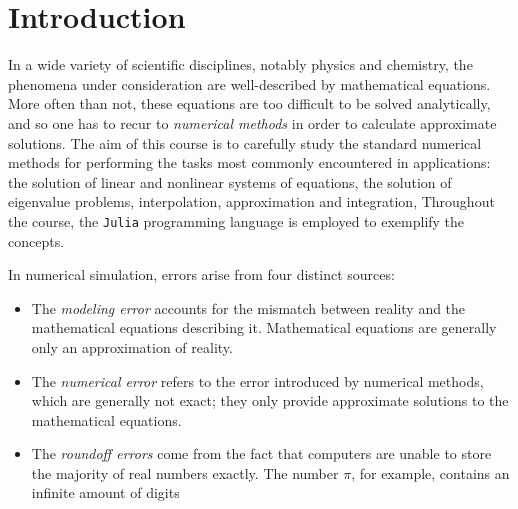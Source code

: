 \chapter*{Introduction}%
In a wide variety of scientific disciplines,
notably physics and chemistry,
the phenomena under consideration are well-described by mathematical equations.
More often than not,
these equations are too difficult to be solved analytically,
and so one has to recur to \emph{numerical methods} in order to calculate approximate solutions.
The aim of this course is to carefully study the standard numerical methods for performing the tasks most commonly encountered in applications:
the solution of linear and nonlinear systems of equations,
the solution of eigenvalue problems,
interpolation,
approximation and integration,
Throughout the course, the \texttt{Julia} programming language is employed to exemplify the concepts.

In numerical simulation,
errors arise from four distinct sources:
\begin{itemize}
    \item
        The \emph{modeling error} accounts for the mismatch between reality and the mathematical equations describing it.
        Mathematical equations are generally only an approximation of reality.
    \item
        The \emph{numerical error}
        refers to the error introduced by numerical methods,
        which are generally not exact;
        they only provide approximate solutions to the mathematical equations.
    \item
        The \emph{roundoff errors} come from the fact that
        computers are unable to store the majority of real numbers exactly.
        The number $\pi$, for example,
        contains an infinite amount of digits
\end{itemize}

